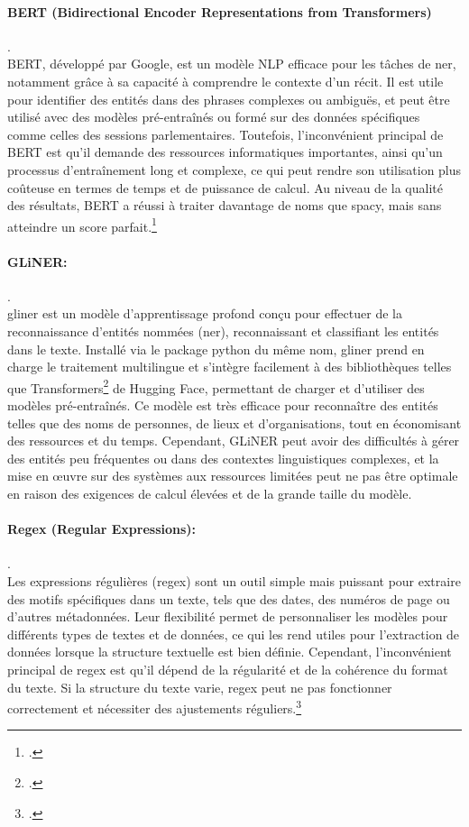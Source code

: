 \paragraph{BERT (Bidirectional Encoder Representations from Transformers)}.\\
\gls{BERT}, développé par Google, est un modèle NLP efficace pour les tâches de \gls{ner}, notamment grâce à sa capacité à comprendre le contexte d'un récit. Il est utile pour identifier des entités dans des phrases complexes ou ambiguës, et peut être utilisé avec des modèles pré-entraînés ou formé sur des données spécifiques comme celles des sessions parlementaires. Toutefois, l'inconvénient principal de BERT est qu'il demande des ressources informatiques importantes, ainsi qu'un processus d'entraînement long et complexe, ce qui peut rendre son utilisation plus coûteuse en termes de temps et de puissance de calcul. Au niveau de la qualité des résultats, \gls{BERT} a réussi à traiter davantage de noms que \gls{spacy}, mais sans atteindre un score parfait.\footcite{huggingface_camembert_ner}

\paragraph{GLiNER:}.\\
\gls{gliner} est un modèle d'apprentissage profond conçu pour effectuer de la reconnaissance d'entités nommées (\gls{ner}), reconnaissant et classifiant les entités dans le texte. Installé via le package \gls{python} du même nom, \gls{gliner} prend en charge le traitement multilingue et s'intègre facilement à des bibliothèques telles que Transformers\footcite{transformers_docs} de Hugging Face, permettant de charger et d'utiliser des modèles pré-entraînés. Ce modèle est très efficace pour reconnaître des entités telles que des noms de personnes, de lieux et d'organisations, tout en économisant des ressources et du temps. Cependant, GLiNER peut avoir des difficultés à gérer des entités peu fréquentes ou dans des contextes linguistiques complexes, et la mise en œuvre sur des systèmes aux ressources limitées peut ne pas être optimale en raison des exigences de calcul élevées et de la grande taille du modèle.

\paragraph{Regex (Regular Expressions):}.\\
Les expressions régulières (\gls{regex}) sont un outil simple mais puissant pour extraire des motifs spécifiques dans un texte, tels que des dates, des numéros de page ou d'autres métadonnées. Leur flexibilité permet de personnaliser les modèles pour différents types de textes et de données, ce qui les rend utiles pour l'extraction de données lorsque la structure textuelle est bien définie. Cependant, l'inconvénient principal de \gls{regex} est qu'il dépend de la régularité et de la cohérence du format du texte. Si la structure du texte varie, \gls{regex} peut ne pas fonctionner correctement et nécessiter des ajustements réguliers.\footcite{regex_tutorial}

